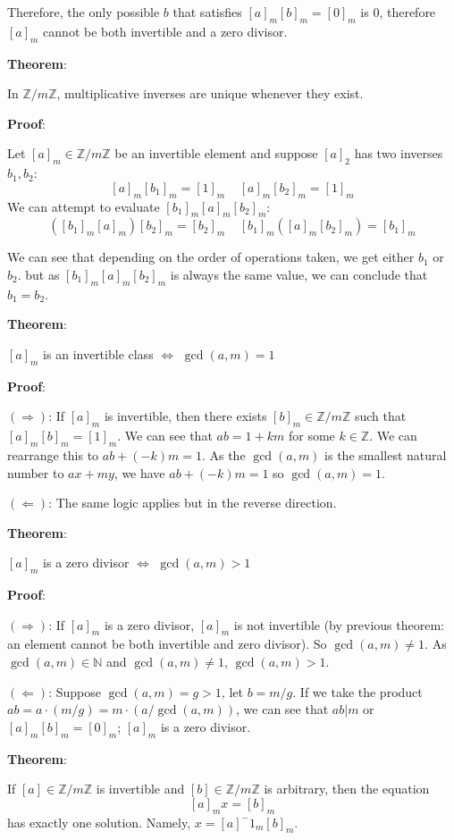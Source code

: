 \documentclass{article}
\begin{document}
\begin{multicols*}{2}
Therefore, the only possible $b$ that satisfies $[a]_m[b]_m = [0]_m$ is $0$, therefore $[a]_m$ cannot be both invertible and a zero divisor.

\textbf{Theorem}:

In $\mathbb{Z}/m\mathbb{Z}$, multiplicative inverses are unique whenever they exist.

\textbf{Proof}:

Let $[a]_m \in \mathbb{Z}/m\mathbb{Z}$ be an invertible element and suppose $[a]_2$ has two inverses $b_1, b_2$: \[[a]_m[b_1]_m = [1]_m\;\;\;\;[a]_m[b_2]_m = [1]_m\] We can attempt to evaluate $[b_1]_m[a]_m[b_2]_m$:\[([b_1]_m[a]_m)[b_2]_m = [b_2]_m\;\;\;\;[b_1]_m([a]_m[b_2]_m) = [b_1]_m\]

We can see that depending on the order of operations taken, we get either $b_1$ or $b_2$. but as $[b_1]_m[a]_m[b_2]_m$ is always the same value, we can conclude that $b_1 = b_2$.

\textbf{Theorem}:

$[a]_m$ is an invertible class $\Leftrightarrow$ $\gcd(a,m) = 1$

\textbf{Proof}:

$(\Rightarrow)$: If $[a]_m$ is invertible, then there exists $[b]_m \in \mathbb{Z}/m\mathbb{Z}$ such that $[a]_m[b]_m = [1]_m$. We can see that $ab = 1 + km$ for some $k \in \mathbb{Z}$. We can rearrange this to $ab + (-k)m = 1$. As the $\gcd(a,m)$ is the smallest natural number to $ax+my$, we have $ab + (-k)m = 1$ so $\gcd(a,m) = 1$.

$(\Leftarrow)$: The same logic applies but in the reverse direction.

\textbf{Theorem}:

$[a]_m$ is a zero divisor $\Leftrightarrow$ $\gcd(a,m) > 1$

\textbf{Proof}:

$(\Rightarrow)$: If $[a]_m$ is a zero divisor, $[a]_m$ is not invertible (by previous theorem: an element cannot be both invertible and zero divisor). So $\gcd(a,m) \neq 1$. As $\gcd(a,m) \in \mathbb{N}$ and $\gcd(a,m) \neq 1$, $\gcd(a,m) > 1$.

$(\Leftarrow)$: Suppose $\gcd(a, m) = g > 1$, let $b = m/g$. If we take the product $ab = a \cdot (m/g) = m \cdot (a/\gcd(a,m))$, we can see that $ab|m$ or $[a]_m[b]_m = [0]_m$; $[a]_m$ is a zero divisor.

\textbf{Theorem}:

If $[a] \in \mathbb{Z}/m\mathbb{Z}$ is invertible and $[b] \in \mathbb{Z}/m\mathbb{Z}$ is arbitrary, then the equation \[[a]_m x = [b]_m\] has exactly one solution. Namely, $x = [a]^-1_m[b]_m$.


\end{multicols*}
\end{document}
